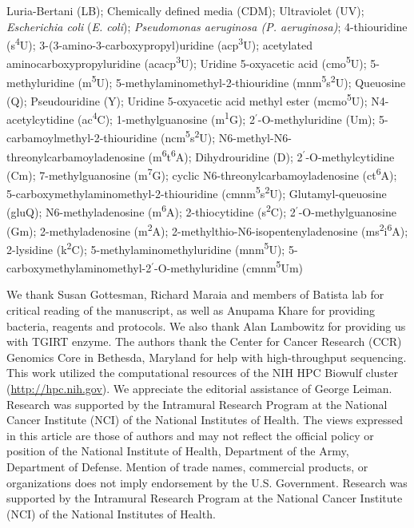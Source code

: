 \documentclass[times, twoside]{zHenriquesLab-StyleBioRxiv}
\begin{document}
Luria-Bertani (LB); Chemically defined media (CDM); Ultraviolet (UV); \textit{Escherichia coli} (\textit{E. coli}); \textit{Pseudomonas aeruginosa (P. aeruginosa)}; 4-thiouridine (s\textsuperscript{4}U); 3-(3-amino-3-carboxypropyl)uridine (acp\textsuperscript{3}U); acetylated aminocarboxypropyluridine (acacp\textsuperscript{3}U); Uridine 5-oxyacetic acid (cmo\textsuperscript{5}U); 5-methyluridine (m\textsuperscript{5}U); 5-methylaminomethyl-2-thiouridine (mnm\textsuperscript{5}s\textsuperscript{2}U); Queuosine (Q); Pseudouridine (Y); Uridine 5-oxyacetic acid methyl ester (mcmo\textsuperscript{5}U); N4-acetylcytidine (ac\textsuperscript{4}C); 1-methylguanosine (m\textsuperscript{1}G); 2\(^{\prime}\)-O-methyluridine (Um); 5-carbamoylmethyl-2-thiouridine (ncm\textsuperscript{5}s\textsuperscript{2}U); N6-methyl-N6-threonylcarbamoyladenosine (m\textsuperscript{6}t\textsuperscript{6}A); Dihydrouridine (D); 2\(^{\prime}\)-O-methylcytidine (Cm); 7-methylguanosine (m\textsuperscript{7}G); cyclic N6-threonylcarbamoyladenosine (ct\textsuperscript{6}A); 5-carboxymethylaminomethyl-2-thiouridine (cmnm\textsuperscript{5}s\textsuperscript{2}U); Glutamyl-queuosine (gluQ); N6-methyladenosine (m\textsuperscript{6}A); 2-thiocytidine (s\textsuperscript{2}C); 2\(^{\prime}\)-O-methylguanosine (Gm); 2-methyladenosine (m\textsuperscript{2}A); 2-methylthio-N6-isopentenyladenosine (ms\textsuperscript{2}i\textsuperscript{6}A); 2-lysidine (k\textsuperscript{2}C); 5-methylaminomethyluridine (mnm\textsuperscript{5}U); 5-carboxymethylaminomethyl-2\(^{\prime}\)-O-methyluridine (cmnm\textsuperscript{5}Um) 

\begin{acknowledgements}
We thank Susan Gottesman, Richard Maraia and members of Batista lab for critical reading of the manuscript, as well as Anupama Khare for providing bacteria, reagents and protocols. We also thank Alan Lambowitz for providing us with TGIRT enzyme. The authors thank the Center for Cancer Research (CCR) Genomics Core in Bethesda, Maryland for help with high-throughput sequencing. This work utilized the computational resources of the NIH HPC Biowulf cluster (\href{http://hpc.nih.gov/}{http://hpc.nih.gov}). We appreciate the editorial assistance of George Leiman. Research was supported by the Intramural Research Program at the National Cancer Institute (NCI) of the National Institutes of Health. The views expressed in this article are those of authors and may not reflect the official policy or position of the National Institute of Health, Department of the Army, Department of Defense. Mention of trade names, commercial products, or organizations does not imply endorsement by the U.S. Government. Research was supported by the Intramural Research Program at the National Cancer Institute (NCI) of the National Institutes of Health.   
\end{acknowledgements}
\end{document}
